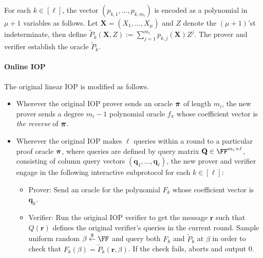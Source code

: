For each $k \in [\ell]$, the vector $(p_{k,1},...,p_{k, m_i})$ is encoded as a polynomial in $\mu + 1$ variables as follows. Let $\mathbf{X} = (X_1,...,X_\mu)$ and $Z$ denote the $(\mu+1)$'st indeterminate, then define $\tilde{P}_k(\mathbf{X}, Z) := \sum_{j=1}^{m_i} p_{k,j}(\mathbf{X}) Z^j$.
The prover and verifier establish the oracle $\tilde{P}_k$. 

\paragraph{Online IOP}
The original linear IOP is modified as follows. 

\begin{itemize}

\item Wherever the original IOP prover sends an oracle $\boldsymbol{\pi}$ of length $m_i$, the new prover sends a degree $m_i - 1$ polynomial oracle $f_\pi$ whose coefficient vector is \emph{the reverse} of $\boldsymbol{\pi}$. 

\item Wherever the original IOP makes $\ell$ queries within a round to a particular proof oracle $\boldsymbol{\pi}$, where queries are defined by query matrix $\mathbf{Q} \in \FF^{m_i \times \ell}$, consisting of column query vectors $(\mathbf{q}_1,...,\mathbf{q}_\ell)$, the new prover and verifier engage in the following interactive subprotocol for each $k \in [\ell]$: 

\begin{itemize}
 \item Prover: Send an oracle for the polynomial $F_k$ whose coefficient vector is $\mathbf{q}_k$. 
 
 \item Verifier: Run the original IOP verifier to get the message $\mathbf{r}$ such that $Q(\mathbf{r})$ defines the original verifier's queries in the current round. Sample uniform random $\beta \sample \FF$ and query both $F_k$ and $\tilde{P}_k$ at $\beta$ in order to check that $F_k (\beta) = \tilde{P}_k(\mathbf{r}, \beta)$. If the check fails, aborts and output 0. 
 

\end{itemize}
\end{itemize}
